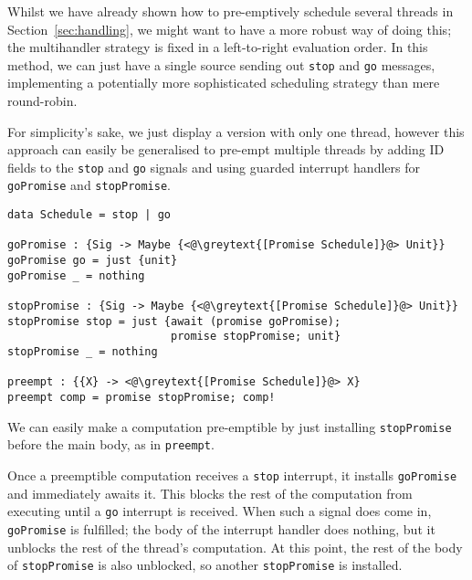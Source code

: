 \documentclass[msc,deptreport,cs]{infthesis} %
\newcommand{\code}[1]{\lstinline{#1}}
\newcommand{\greytext}[1]{\textcolor{black!40}{#1}}
\begin{document}
Whilst we have already shown how to pre-emptively schedule several threads in
Section~\ref{sec:handling}, we might want to have a more robust way of doing
this; the multihandler strategy is fixed in a left-to-right evaluation order. In
this method, we can just have a single source sending out \code{stop} and
\code{go} messages, implementing a potentially more sophisticated scheduling
strategy than mere round-robin.

For simplicity's sake, we just display a version with only one thread, however
this approach can easily be generalised to pre-empt multiple threads by adding
ID fields to the \code{stop} and \code{go} signals and using guarded interrupt
handlers for \code{goPromise} and \code{stopPromise}.

\begin{lstlisting}
data Schedule = stop | go

goPromise : {Sig -> Maybe {<@\greytext{[Promise Schedule]}@> Unit}}
goPromise go = just {unit}
goPromise _ = nothing

stopPromise : {Sig -> Maybe {<@\greytext{[Promise Schedule]}@> Unit}}
stopPromise stop = just {await (promise goPromise);
                         promise stopPromise; unit}
stopPromise _ = nothing

preempt : {{X} -> <@\greytext{[Promise Schedule]}@> X}
preempt comp = promise stopPromise; comp!
\end{lstlisting}

\noindent We can easily make a computation pre-emptible by just installing
\code{stopPromise} before the main body, as in \code{preempt}.

Once a preemptible computation receives a \code{stop} interrupt, it installs
\code{goPromise} and immediately awaits it. This blocks the rest of the
computation from executing until a \code{go} interrupt is received. When such a
signal does come in, \code{goPromise} is fulfilled; the body of the interrupt
handler does nothing, but it unblocks the rest of the thread's computation. At
this point, the rest of the body of \code{stopPromise} is also unblocked, so
another \code{stopPromise} is installed.



\end{document}
